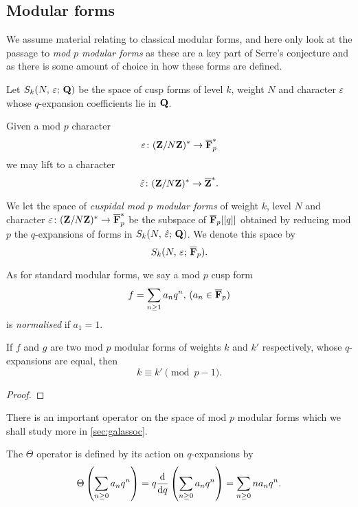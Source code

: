\documentclass[a4paper,12pt]{article}
\begin{document}
\subsection{Modular forms}
We assume material relating to classical modular forms, and here only look at the passage to \emph{mod $p$ modular forms} as these are a key part of Serre's conjecture and as there is some amount of choice in how these forms are defined.

\begin{defn} %
Let $S_k(N,\,\varepsilon;\,\mathbf{Q})$ be the space of cusp forms of level $k$, weight $N$ and character $\varepsilon$ whose $q$-expansion coefficients lie in $\mathbf{Q}$.

Given a mod $p$ character
\[
\varepsilon\colon (\mathbf{Z}/N\mathbf{Z})^* \to \overline{\mathbf{F}}_p^*
\]
we may lift to a character
\[
\hat{\varepsilon}\colon (\ZZ/N\ZZ)^* \to \Zb^*. %
\]

We let the space of \emph{cuspidal mod $p$ modular forms} of weight $k$, level $N$ and character $\varepsilon\colon (\mathbf{Z}/N\mathbf{Z})^* \to \overline{\mathbf{F}}_p^*$ be the subspace of $\overline{\mathbf{F}}_p[[q]]$ obtained by reducing mod $p$ the $q$-expansions of forms in $S_k(N,\,\hat{\varepsilon};\,\mathbf{Q})$.
We denote this space by
\[
S_k(N,\,\varepsilon;\,\overline{\mathbf{F}}_p).
\]
\end{defn}

\begin{defn}
As for standard modular forms, we say a mod $p$ cusp form
\[
f = \sum_{n\ge 1} a_n q^n,\,(a_n\in\overline{\mathbf{F}}_p)
\]
is \emph{normalised} if $a_1 = 1$.
\end{defn}

\begin{prop}\label{prop:pm1}
If $f$ and $g$ are two mod $p$ modular forms of weights $k$ and $k'$ respectively, whose $q$-expansions are equal, then
\[
k \equiv k' \pmod{p-1}.
\]
\end{prop}
\begin{proof}
\end{proof}

\begin{ex}
\end{ex}

There is an important operator on the space of mod $p$ modular forms which we shall study more in \cref{sec:galassoc}.

\begin{defn}\label{def:theta}
The $\Theta$ operator is defined by its action on $q$-expansions by
\[
\Theta\left(\sum_{n\ge 0} a_nq^n\right) = q\frac{\mathrm{d}}{\mathrm{d}q} \left(\sum_{n\ge 0} a_nq^n\right) = \sum_{n\ge 0} na_nq^n.
\]
\end{defn}
\end{document}
